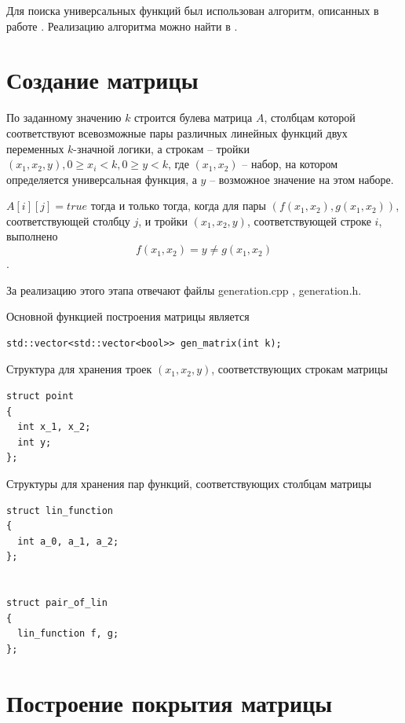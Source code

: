 \documentclass[oneside,final,14pt]{extreport}
\begin{document}
Для поиска универсальных функций был использован алгоритм, описанных в работе \cite{k_not_prime}. 
Реализацию алгоритма можно найти в \cite{code}.

\section*{Создание матрицы}

По заданному значению \(k\) строится булева матрица \(A\), столбцам которой соответствуют всевозможные пары различных линейных 
функций двух переменных \(k\)-значной логики, а строкам -- тройки \((x_1, x_2, y), 0 \geq x_i < k, 0 \geq y < k\), 
где \((x_1, x_2)\) -- набор, на котором определяется универсальная функция, а \(y\) -- возможное значение на этом наборе.

\(A[i][j] = true\) тогда и только тогда, когда для пары \((f(x_1, x_2), g(x_1, x_2))\), соответствующей столбцу \(j\), и тройки 
\((x_1, x_2, y)\), соответствующей строке \(i\), выполнено \[f(x_1, x_2) = y \neq g(x_1, x_2)\].

За реализацию этого этапа отвечают файлы \dq generation.cpp \dq, \dq generation.h\dq.

Основной функцией построения матрицы является

\begin{lstlisting}
std::vector<std::vector<bool>> gen_matrix(int k);
\end{lstlisting}

Структура для хранения троек \((x_1, x_2, y)\), соответствующих строкам матрицы
\begin{lstlisting}
struct point
{
  int x_1, x_2;
  int y;
};
\end{lstlisting}

Структуры для хранения пар функций, соответствующих столбцам матрицы
\begin{lstlisting}
struct lin_function
{
  int a_0, a_1, a_2;
};


struct pair_of_lin
{
  lin_function f, g;
};
\end{lstlisting}


\section*{Построение покрытия матрицы}
\end{document}
